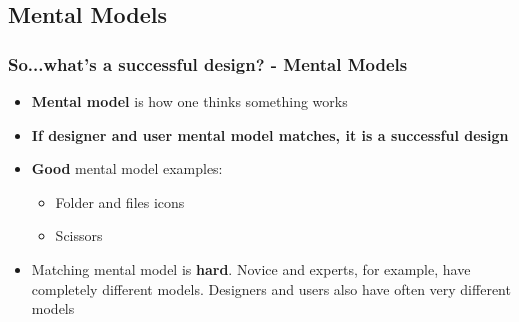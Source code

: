 \documentclass{beamer}
\begin{document}
\subsection{Mental Models}
\begin{frame}
\frametitle{So...what's a successful design?  - Mental Models}
\begin{itemize}
	\item \textbf{Mental model} is how one thinks something works
	\item \textbf{If designer and user mental model matches, it is a successful design}
	\item \textbf{Good} mental model examples: 
	\begin{itemize}
		\item Folder and files icons
		\item Scissors
	\end{itemize}		
	\item Matching mental model is \textbf{hard}.  Novice and experts, for example, have completely different models.   Designers and users also have often very different models
\end{itemize}
\end{frame}


\end{document}
